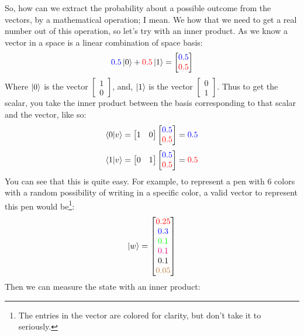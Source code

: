 So, how can we extract the probability about a possible outcome from the vectors, by a mathematical operation; I mean. We how that we need to get a real number out of this operation, so let's try with an inner product.
As we know a vector in a space is a linear combination of space basis:
$$
\textcolor{blue}{0.5}\ket{0} + \textcolor{red}{0.5}\ket{1} = \begin{bmatrix}
	\textcolor{blue}{0.5} \\
	\textcolor{red}{0.5}
\end{bmatrix}
$$
Where $\ket{0}$ is the vector $\begin{bmatrix} 1 \\ 0\end{bmatrix}$, and, $\ket{1}$ is the vector $\begin{bmatrix} 0 \\ 1 \end{bmatrix}$. Thus to get the scalar, you take the inner product between the basis corresponding to that scalar and the vector, like so:
$$
\bra{0}\ket{v} =
\begin{bmatrix}
	1 &
	0
\end{bmatrix}
\begin{bmatrix}
	\textcolor{blue}{0.5} \\
	\textcolor{red}{0.5}
\end{bmatrix}
= \textcolor{blue}{0.5}
$$
$$
\bra{1}\ket{v} =
	\begin{bmatrix}
		0 &
		1
	\end{bmatrix}
	\begin{bmatrix}
		\textcolor{blue}{0.5} \\
		\textcolor{red}{0.5}
	\end{bmatrix}
	= \textcolor{red}{0.5}
$$
You can see that this is quite easy. For example, to represent a pen with 6 colors with a random possibility of writing in a specific color, a valid vector to represent this pen would be\footnote{The entries in the vector are colored for clarity, but don't take it to seriously.}:
$$
\ket{w} =
\begin{bmatrix}
	\textcolor{red}{0.25} \\
	\textcolor{blue}{0.3 }\\
	\textcolor{green}{0.1 }\\
	\textcolor{magenta}{0.1 }\\
	\textcolor{black}{0.1 }\\
	\textcolor{brown}{0.05}
\end{bmatrix}
$$
Then we can measure the state with an inner product:
